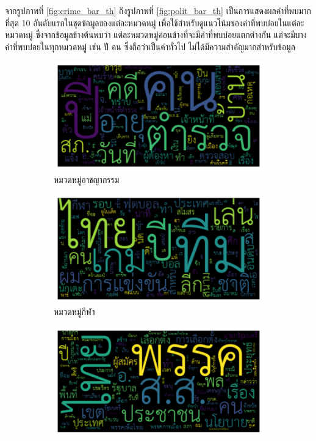 \documentclass[12pt,oneside,openright,a4paper]{cpe-thai-project}
\begin{document}
        \hspace{1cm}จากรูปภาพที่ \ref{fig:crime_bar_th} ถึงรูปภาพที่ \ref{fig:polit_bar_th} เป็นการแสดงผลคำที่พบมากที่สุด 10 อันดับแรกในชุดข้อมูลของแต่ละหมวดหมู่
        เพื่อใช้สำหรับดูแนวโน้มของคำที่พบบ่อยในแต่ละหมวดหมู่ ซึ่งจากข้อมูลข้างต้นพบว่า แต่ละหมวดหมู่ค่อนข้างที่จะมีคำที่พบบ่อยแตกต่างกัน แต่จะมีบางคำที่พบบ่อยในทุกหมวดหมู่
        เช่น ปี คน ซึ่งถือว่าเป็นคำทั่วไป ไม่ได้มีความสำคัญมากสำหรับข้อมูล 
        \begin{figure}[!ht]\centering
          \begin{subfigure}{0.49\textwidth}
            \includegraphics[width=\linewidth]{./img/thai_stat/crime_wc.png} 
            \caption{หมวดหมู่อาชญากรรม}
            \label{fig:subim_th1}
          \end{subfigure}
          \begin{subfigure}{0.49\textwidth}
            \includegraphics[width=\linewidth]{./img/thai_stat/sport_wc.png}
            \caption{หมวดหมู่กีฬา}
            \label{fig:subim_th2}
          \end{subfigure}
          \begin{subfigure}{0.49\textwidth}
            \includegraphics[width=\linewidth]{./img/thai_stat/polit_wc.png}

\end{subfigure}
\end{figure}
\end{document}
